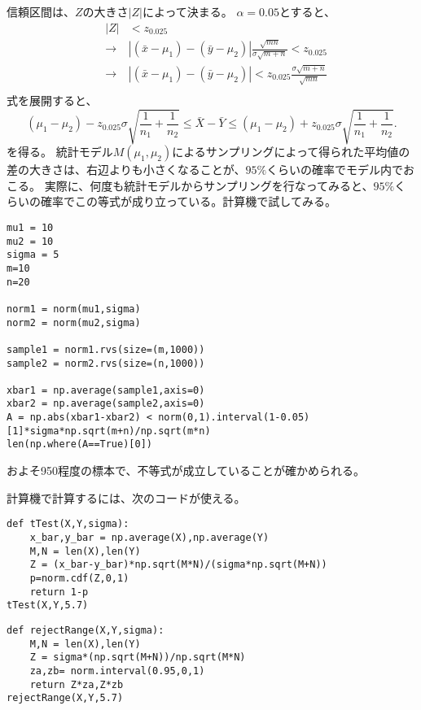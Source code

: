 信頼区間は、$Z$の大きさ$|Z|$によって決まる。
$\alpha=0.05$とすると、
\begin{eqnarray*}
&|Z|& < z_{0.025}\\
&\rightarrow & |(\bar{x}-\mu_1)-(\bar{y}-\mu_2)|\frac{\sqrt{mn}}{\sigma\sqrt{m+n}} < z_{0.025}\\
&\rightarrow& |(\bar{x}-\mu_1)-(\bar{y}-\mu_2)| <z_{0.025}\frac{ \sigma\sqrt{m+n} }{ \sqrt{mn }}\\
\end{eqnarray*}
式を展開すると、
\begin{equation*}
    (\mu_1-\mu_2)-z_{0.025}\sigma\sqrt{\frac{1}{n_1}+\frac{1}{n_2}} \leq \bar{X}-\bar{Y} \leq (\mu_1-\mu_2)+z_{0.025}\sigma\sqrt{\frac{1}{n_1}+\frac{1}{n_2}}.
\end{equation*}
を得る。
統計モデル$M(\mu_1,\mu_2)$によるサンプリングによって得られた平均値の差の大きさは、右辺よりも小さくなることが、$95\%$くらいの確率でモデル内でおこる。
実際に、何度も統計モデルからサンプリングを行なってみると、$95\%$くらいの確率でこの等式が成り立っている。計算機で試してみる。
\begin{lstlisting}
mu1 = 10
mu2 = 10
sigma = 5
m=10
n=20

norm1 = norm(mu1,sigma)
norm2 = norm(mu2,sigma)

sample1 = norm1.rvs(size=(m,1000))
sample2 = norm2.rvs(size=(n,1000))

xbar1 = np.average(sample1,axis=0)
xbar2 = np.average(sample2,axis=0)
A = np.abs(xbar1-xbar2) < norm(0,1).interval(1-0.05)[1]*sigma*np.sqrt(m+n)/np.sqrt(m*n)
len(np.where(A==True)[0])
\end{lstlisting}
およそ950程度の標本で、不等式が成立していることが確かめられる。

計算機で計算するには、次のコードが使える。
\begin{lstlisting}
def tTest(X,Y,sigma):
    x_bar,y_bar = np.average(X),np.average(Y)
    M,N = len(X),len(Y)
    Z = (x_bar-y_bar)*np.sqrt(M*N)/(sigma*np.sqrt(M+N))
    p=norm.cdf(Z,0,1)
    return 1-p
tTest(X,Y,5.7)
\end{lstlisting}


\begin{lstlisting}
def rejectRange(X,Y,sigma):
    M,N = len(X),len(Y)
    Z = sigma*(np.sqrt(M+N))/np.sqrt(M*N)
    za,zb= norm.interval(0.95,0,1)
    return Z*za,Z*zb
rejectRange(X,Y,5.7)
\end{lstlisting}

\begin{comment}
$Z$の不等式を変形していくと、次がわかる
\begin{equation*}
    (\bar{X}-\bar{Y})-z_{0.025}\sigma\sqrt{\frac{1}{n_1}+\frac{1}{n_2}} \leq \mu_1-\mu_2 \leq (\bar{X}-\bar{Y})+z_{0.025}\sigma\sqrt{\frac{1}{n_1}+\frac{1}{n_2}}.
\end{equation*}
この式の意味は、何だっけ？？？TODO
\end{comment}



